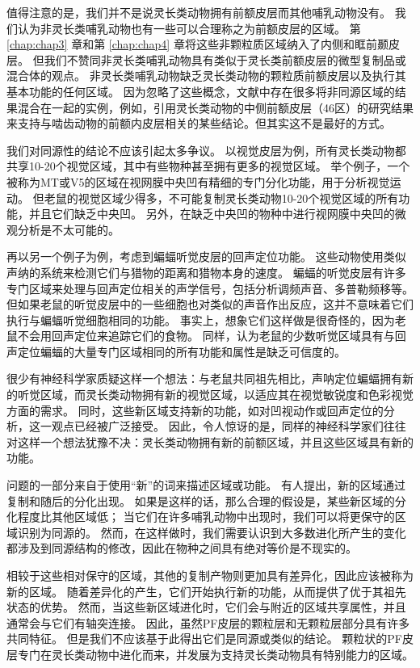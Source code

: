 值得注意的是，我们并不是说灵长类动物拥有前额皮层而其他哺乳动物没有。
我们认为非灵长类哺乳动物也有一些可以合理称之为前额皮层的区域。
第 \ref{chap:chap3} 章和第 \ref{chap:chap4} 章将这些非颗粒质区域纳入了内侧和眶前颞皮层。
但我们不赞同非灵长类哺乳动物具有类似于灵长类前额皮层的微型复制品或混合体的观点。
非灵长类哺乳动物缺乏灵长类动物的颗粒质前额皮层以及执行其基本功能的任何区域。
因为忽略了这些概念，文献中存在很多将非同源区域的结果混合在一起的实例，例如，引用灵长类动物的中侧前额皮层（46区）的研究结果来支持与啮齿动物的前额内皮层相关的某些结论。但其实这不是最好的方式。


我们对同源性的结论不应该引起太多争议。
以视觉皮层为例，所有灵长类动物都共享10-20个视觉区域，其中有些物种甚至拥有更多的视觉区域\cite{kaas2020evolution}。
举个例子，一个被称为MT或V5的区域在视网膜中央凹有精细的专门分化功能，用于分析视觉运动。
但老鼠的视觉区域少得多\cite{rosa1999evolution,lyon200734}，不可能复制灵长类动物10-20个视觉区域的所有功能，并且它们缺乏中央凹。
另外，在缺乏中央凹的物种中进行视网膜中央凹的微观分析是不太可能的。


再以另一个例子为例，考虑到蝙蝠听觉皮层的回声定位功能。
这些动物使用类似声纳的系统来检测它们与猎物的距离和猎物本身的速度。
蝙蝠的听觉皮层有许多专门区域来处理与回声定位相关的声学信号，包括分析调频声音、多普勒频移等\cite{suga1997cortical,fitzpatrick1998distribution}。
但如果老鼠的听觉皮层中的一些细胞也对类似的声音作出反应，这并不意味着它们执行与蝙蝠听觉细胞相同的功能。
事实上，想象它们这样做是很奇怪的，因为老鼠不会用回声定位来追踪它们的食物。
同样，认为老鼠的少数听觉区域具有与回声定位蝙蝠的大量专门区域相同的所有功能和属性是缺乏可信度的。


很少有神经科学家质疑这样一个想法：与老鼠共同祖先相比，声呐定位蝙蝠拥有新的听觉区域，而灵长类动物拥有新的视觉区域，以适应其在视觉敏锐度和色彩视觉方面的需求。
同时，这些新区域支持新的功能，如对凹视动作或回声定位的分析，这一观点已经被广泛接受。
因此，令人惊讶的是，同样的神经科学家们往往对这样一个想法犹豫不决：灵长类动物拥有新的前额区域，并且这些区域具有新的功能。


问题的一部分来自于使用“新”的词来描述区域或功能。
有人提出，新的区域通过复制和随后的分化出现\cite{krubitzer2000arealization}。
如果是这样的话，那么合理的假设是，某些新区域的分化程度比其他区域低；
当它们在许多哺乳动物中出现时，我们可以将更保守的区域识别为同源的。
然而，在这样做时，我们需要认识到大多数进化所产生的变化都涉及到同源结构的修改，因此在物种之间具有绝对等价是不现实的。


相较于这些相对保守的区域，其他的复制产物则更加具有差异化，因此应该被称为新的区域。
随着差异化的产生，它们开始执行新的功能，从而提供了优于其祖先状态的优势。
然而，当这些新区域进化时，它们会与附近的区域共享属性，并且通常会与它们有轴突连接。
因此，虽然PF皮层的颗粒层和无颗粒层部分具有许多共同特征。
但是我们不应该基于此得出它们是同源或类似的结论。
颗粒状的PF皮层专门在灵长类动物中进化而来，并发展为支持灵长类动物具有特别能力的区域。


